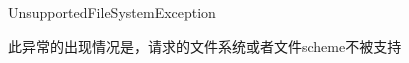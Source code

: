 \begin{XeClass}{UnsupportedFileSystemException}
   
 此异常的出现情况是，请求的文件系统或者文件scheme不被支持

\end{XeClass}
